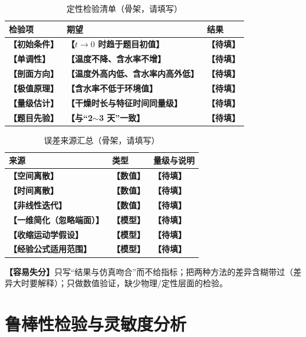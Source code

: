 \documentclass[12pt,a4paper]{article}
\newcommand{\pitfall}[1]{\par\noindent\textbf{【容易失分】}#1\par}     %
\newcommand{\ph}[1]{\textbf{【#1】}}                                   %
\begin{document}
\begin{table}[H]
\centering
\caption{定性检验清单（骨架，请填写）}
\label{tab:qualitative}
\begin{tabular}{p{3.6cm}p{6.2cm}p{4.4cm}}
\toprule
检验项 & 期望 & 结果\\
\midrule
\ph{初始条件} & \ph{$t\to0$ 时趋于题目初值} & \ph{待填}\\
\ph{单调性} & \ph{温度不降、含水率不增} & \ph{待填}\\
\ph{剖面方向} & \ph{温度外高内低、含水率内高外低} & \ph{待填}\\
\ph{极值原理} & \ph{含水率不低于环境值} & \ph{待填}\\
\ph{量级估计} & \ph{干燥时长与特征时间同量级} & \ph{待填}\\
\ph{题目先验} & \ph{与“2$\sim$3 天”一致} & \ph{待填}\\
\bottomrule
\end{tabular}
\end{table}

\begin{table}[H]
\centering
\caption{误差来源汇总（骨架，请填写）}
\label{tab:error-source}
\begin{tabular}{p{4.4cm}p{2.6cm}p{7.2cm}}
\toprule
来源 & 类型 & 量级与说明\\
\midrule
\ph{空间离散} & \ph{数值} & \ph{待填}\\
\ph{时间离散} & \ph{数值} & \ph{待填}\\
\ph{非线性迭代} & \ph{数值} & \ph{待填}\\
\ph{一维简化（忽略端面）} & \ph{模型} & \ph{待填}\\
\ph{收缩运动学假设} & \ph{模型} & \ph{待填}\\
\ph{经验公式适用范围} & \ph{模型} & \ph{待填}\\
\bottomrule
\end{tabular}
\end{table}

\pitfall{只写“结果与仿真吻合”而不给指标；把两种方法的差异含糊带过（差异大时要解释）；只做数值验证，缺少物理/定性层面的检验。}

\clearpage

\section{鲁棒性检验与灵敏度分析}
\end{document}
